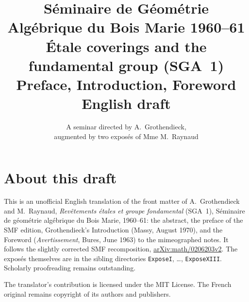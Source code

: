 \documentclass[11pt,a4paper,oneside]{amsbook}
\title[SGA~1, front matter (English draft)]{S\'eminaire de G\'eom\'etrie Alg\'ebrique du Bois Marie 1960--61\\[.5em]
\'Etale coverings and the fundamental group (SGA~1)\\
{\normalsize Preface, Introduction, Foreword\\English draft}}
\author{A seminar directed by A.\ Grothendieck,\\
augmented by two exposés of Mme M.\ Raynaud}
\date{}
\begin{document}
\frontmatter
\maketitle

\chapter*{About this draft}
This is an unofficial English translation of the front matter of
A.\ Grothendieck and M.\ Raynaud,
\textit{Rev\^etements \'etales et groupe fondamental} (SGA~1),
S\'eminaire de g\'eom\'etrie alg\'ebrique du Bois Marie, 1960--61:
the abstract, the preface of the SMF edition, Grothendieck's
Introduction (Massy, August 1970), and the Foreword
(\emph{Avertissement}, Bures, June 1963) to the mimeographed notes.
It follows the slightly corrected SMF recomposition,
\href{https://arxiv.org/abs/math/0206203v2}{arXiv:math/0206203v2}.
The exposés themselves are in the sibling directories
\texttt{ExposeI}, \dots, \texttt{ExposeXIII}. Scholarly proofreading
remains outstanding.

The translator's contribution is licensed under
the MIT License.
The French original remains copyright of its authors and publishers.


\end{document}
